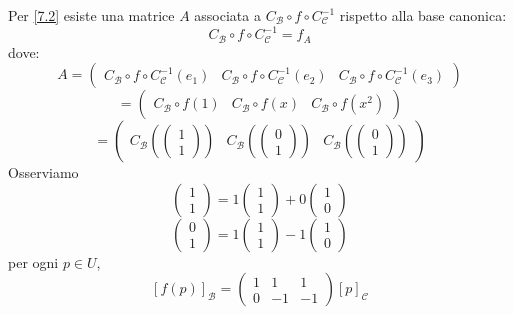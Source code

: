 \documentclass[a4paper]{article}
\theoremstyle{break}
\theoremstyle{break}
\theoremstyle{break}
\theoremstyle{break}
\begin{document}
\begin{example}
\noindent Per \ref{7.2} esiste una matrice \( A \) associata a \( C_{\mathcal{B}} \circ f \circ
C_{\mathcal{C}}^{-1}\) rispetto alla base canonica:
\[
  C_{\mathcal{B}} \circ f \circ C_{\mathcal{C}}^{-1} = f_A
\] 
dove:
\[
A = \begin{pmatrix} 
  C_{\mathcal{B}} \circ f \circ C_{\mathcal{C}}^{-1}(e_1) &
  C_{\mathcal{B}} \circ f \circ C_{\mathcal{C}}^{-1}(e_2) &
  C_{\mathcal{B}} \circ f \circ C_{\mathcal{C}}^{-1}(e_3)
\end{pmatrix} 
\] 
\[
= \begin{pmatrix} 
  C_{\mathcal{B}} \circ f (1) &
  C_{\mathcal{B}} \circ f (x) &
  C_{\mathcal{B}} \circ f (x^2)
\end{pmatrix} 
\] 
\[
= \begin{pmatrix} 
  C_{\mathcal{B}}\left( \begin{pmatrix} 1\\1 \end{pmatrix}  \right) &
  C_{\mathcal{B}}\left( \begin{pmatrix} 0\\1 \end{pmatrix}  \right) &
  C_{\mathcal{B}}\left( \begin{pmatrix} 0\\1 \end{pmatrix}  \right)
\end{pmatrix} 
\] 
Osserviamo \[ \begin{pmatrix} 1\\1 \end{pmatrix} = 1 \begin{pmatrix} 1\\1 \end{pmatrix} 
+ 0 \begin{pmatrix} 1\\0 \end{pmatrix}  \]
\[
\begin{pmatrix} 0\\1 \end{pmatrix} = 1 \begin{pmatrix} 1\\1 \end{pmatrix}
- 1 \begin{pmatrix} 1\\0 \end{pmatrix}
\] 
per ogni \( p \in U \), \[ [f(p)]_{\mathcal{B}} = \begin{pmatrix} 
  1 & 1 & 1\\
  0 & -1 & -1
\end{pmatrix}[p]_{\mathcal{C}}  \]


\end{example}
\end{document}
